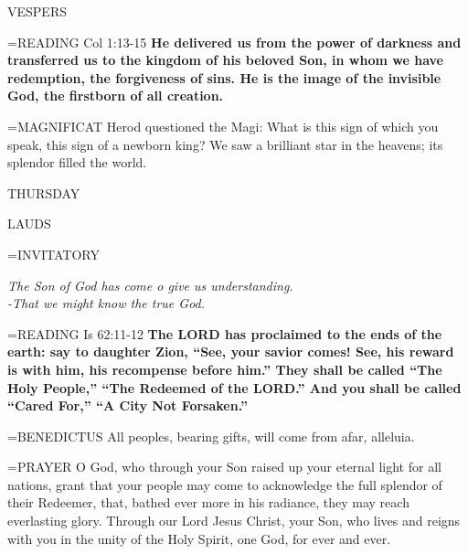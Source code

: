 \begin{flushleft}\normalsize VESPERS\\\end{flushleft}
\hangindent=\parindent \small{READING}   Col 1:13-15 \textbf{  He delivered us from the power of darkness and transferred us to the kingdom of his beloved Son, in whom we have redemption, the forgiveness of sins. He is the image of the invisible God, the firstborn of all creation.\\}

\hangindent=\parindent \small{MAGNIFICAT 	Herod questioned the Magi: What is this sign of which you speak, this sign of a newborn king? We saw a brilliant star in the heavens; its splendor filled the world.\\}

\begin{center}
\normalsize THURSDAY
\end{center}

\begin{flushleft}\normalsize LAUDS\\\end{flushleft}
\hangindent=\parindent \small{INVITATORY}
\begin{center}
\textit{The Son of God has come o give us understanding.\\}
\textit{-That we might know the true God.\\}
\end{center}

\hangindent=\parindent \small{READING}    Is 62:11-12 \textbf{   The LORD has proclaimed to the ends of the earth: say to daughter Zion, “See, your savior comes! See, his reward is with him, his recompense before him.” They shall be called “The Holy People,” “The Redeemed of the LORD.” And you shall be called “Cared For,” “A City Not Forsaken.”\\}

\hangindent=\parindent \small{BENEDICTUS 	All peoples, bearing gifts, will come from afar, alleluia.\\}

\hangindent=\parindent \small{PRAYER 	O God, who through your Son raised up your eternal light for all nations, grant that your people may come to acknowledge the full splendor of their Redeemer, that, bathed ever more in his radiance, they may reach everlasting glory. Through our Lord Jesus Christ, your Son, who lives and reigns with you in the unity of the Holy Spirit, one God, for ever and ever.}


